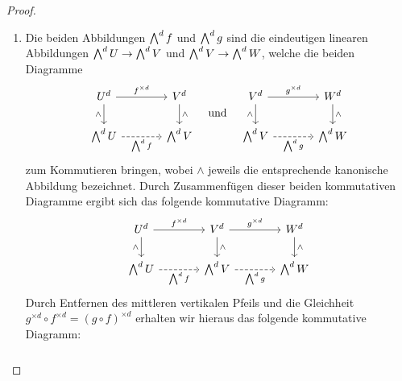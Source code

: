 \begin{proof}
  \begin{enumerate}
    \item
      Die beiden Abbildungen $\bigwedge^{d} f$ und $\bigwedge^{d} g$ sind die eindeutigen linearen Abbildungen $\bigwedge^{d} U \to \bigwedge^{d} V$ und $\bigwedge^{d} V \to \bigwedge^{d} W$, welche die beiden Diagramme
      \[
        \begin{tikzcd}[column sep = large]
            U^d
            \arrow{r}{f^{\times d}}
            \arrow[swap]{d}{\wedge}
          & V^d
            \arrow{d}{\wedge}
          \\
            \exteriorpower{d}{U}
            \arrow[swap, dashed]{r}{\exteriorpower{d}{f}}
          & \exteriorpower{d}{V}
        \end{tikzcd}
        \quad\text{und}\quad
        \begin{tikzcd}[column sep = large]
            V^d
            \arrow{r}{g^{\times d}}
            \arrow[swap]{d}{\wedge}
          & W^d
            \arrow{d}{\wedge}
          \\
            \exteriorpower{d}{V}
            \arrow[swap, dashed]{r}{\exteriorpower{d}{g}}
          & \exteriorpower{d}{W}
        \end{tikzcd}
      \]
      zum Kommutieren bringen, wobei $\wedge$ jeweils die entsprechende kanonische Abbildung bezeichnet.
      Durch Zusammenfügen dieser beiden kommutativen Diagramme ergibt sich das folgende kommutative Diagramm:
      \[
        \begin{tikzcd}[column sep = large]
            U^d
            \arrow{r}{f^{\times d}}
            \arrow[swap]{d}{\wedge}
          & V^d
            \arrow{r}{g^{\times d}}
            \arrow{d}{\wedge}
          & W^d
            \arrow{d}{\wedge}
          \\
            \exteriorpower{d}{U}
            \arrow[swap, dashed]{r}{\exteriorpower{d}{f}}
          & \exteriorpower{d}{V}
            \arrow[swap, dashed]{r}{\exteriorpower{d}{g}}
          & \exteriorpower{d}{W}
        \end{tikzcd}
      \]
      Durch Entfernen des mittleren vertikalen Pfeils und die Gleichheit $g^{\times d} \circ f^{\times d} = (g \circ f)^{\times d}$ erhalten wir hieraus das folgende kommutative Diagramm:
      \begin{equation}
        \label{diagram: final diagram}
        \begin{tikzcd}[column sep = 6em]

\end{tikzcd}
\end{equation}
\end{enumerate}
\end{proof}
